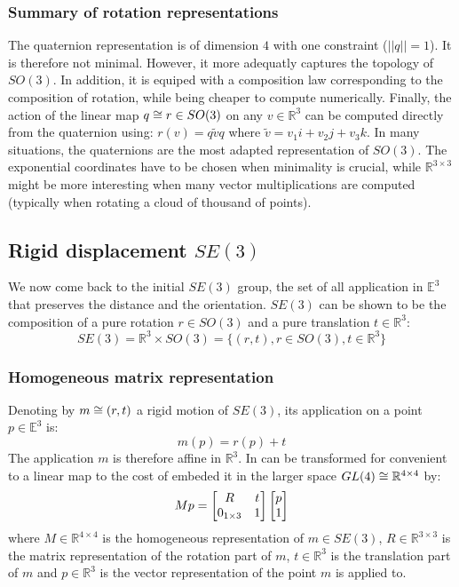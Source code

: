 \documentclass{book}
\begin{document}
\subsubsection{Summary of rotation representations}
The quaternion representation is of dimension $4$ with one constraint ($||q||=1$). It is therefore not minimal. However, it more adequatly captures the topology of $SO(3)$. In addition, it is equiped with a composition law corresponding to the composition of rotation, while being cheaper to compute numerically. Finally, the action of the linear map $q \cong r \in SO(3)$ on any $v \in \mathbb{R}^3$ can be computed directly from the quaternion using:
$ r(v) = q \tilde{v} q  $
where $\tilde v = v_1 i + v_2 j + v_3 k$. In many situations, the quaternions are the most adapted representation of $SO(3)$. The exponential coordinates have to be chosen when minimality is crucial, while $\mathbb{R}^{3\times3}$ might be more interesting when many vector multiplications are computed (typically when rotating a cloud of thousand of points).

\subsection{Rigid displacement $SE(3)$}

We now come back to the initial $SE(3)$ group, the set of all application in $\mathbb{E}^3$ that preserves the distance and the orientation. $SE(3)$ can be shown to be the composition of a pure rotation $r \in SO(3)$ and a pure translation $t \in \mathbb{R}^3$:
\[ SE(3) = \mathbb{R}^3 \times SO(3) = \{ (r,t), r\in SO(3), t \in \mathbb{R}^3 \} \]

\subsubsection{Homogeneous matrix representation}
Denoting by $m \cong (r,t)$ a rigid motion of $SE(3)$, its application on a point $p \in \mathbb{E}^3$ is:
\[ m(p) = r(p) + t \]
The application $m$ is therefore affine in $\mathbb{R}^3$. In can be transformed for convenient to a linear map to the cost of embeded it in the larger space $GL(4) \cong \mathbb{R}^{4\times4}$ by:
\[ M p = \begin{bmatrix} R & t \\ 0_{1\times3} & 1 \end{bmatrix} \begin{bmatrix} p \\ 1 \end{bmatrix} \]
where $M \in \mathbb{R}^{4\times4}$ is the homogeneous representation of $m \in SE(3)$, $R \in  \mathbb{R}^{3\times3}$ is the matrix representation of the rotation part of $m$, $t \in \mathbb{R}^3$ is the translation part of $m$ and $p \in \mathbb{R}^3$ is the vector representation of the point $m$ is applied to.
\end{document}
